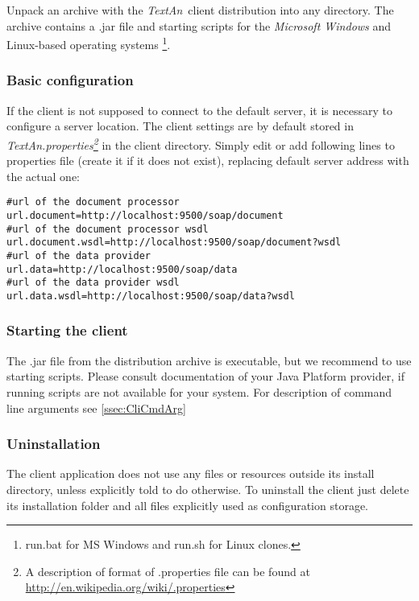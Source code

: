 \documentclass[12pt,a4paper]{report}
\newcommand{\textan}{\emph{TextAn}}
\begin{document}
Unpack an archive with the \textan\ client distribution into any directory. 
The archive contains a .jar file and starting scripts for the \emph{Microsoft Windows} and Linux-based operating systems
\footnote{run.bat for MS Windows and run.sh for Linux clones.\label{runscript_note}}.

\subsubsection{Basic configuration}

If the client is not supposed to connect to the default server, it is necessary to configure a server location. 
The client settings are by default stored in \emph{TextAn.properties\footnote{A description of format of .properties file can be found at \url{http://en.wikipedia.org/wiki/.properties}}}
in the client directory. 
Simply edit or add following lines to properties file (create it if it does not exist),
replacing default server address with the actual one:
\begin{lstlisting}[frame=single,language=properties]
#url of the document processor
url.document=http://localhost:9500/soap/document
#url of the document processor wsdl
url.document.wsdl=http://localhost:9500/soap/document?wsdl
#url of the data provider
url.data=http://localhost:9500/soap/data
#url of the data provider wsdl
url.data.wsdl=http://localhost:9500/soap/data?wsdl
\end{lstlisting}

\subsubsection{Starting the client}

The .jar file from the distribution archive is executable,
but we recommend to use starting scripts.
Please consult documentation of your Java Platform provider,
if running scripts are not available for your system.
For description of command line arguments see \ref{ssec:CliCmdArg}

\subsubsection{Uninstallation}

The client application does not use any files or resources outside its install directory,
unless explicitly told to do otherwise.
To uninstall the client just delete its installation folder
and all files explicitly used as configuration storage.
\end{document}
